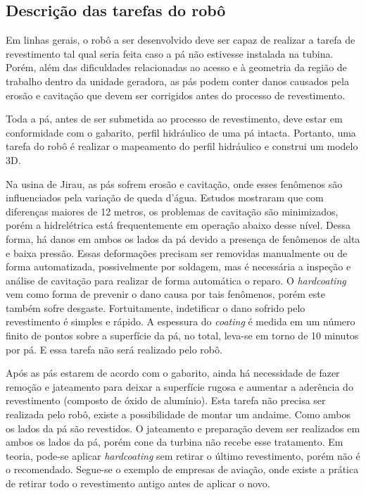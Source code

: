 \subsection{Descrição das tarefas do robô}

Em linhas gerais, o robô a ser desenvolvido deve ser capaz de realizar a tarefa
de revestimento tal qual seria feita caso a pá não estivesse instalada na
tubina. Porém, além das dificuldades relacionadas ao acesso e à geometria da
região de trabalho dentro da unidade geradora, as pás podem conter danos
causados pela erosão e cavitação que devem ser corrigidos antes do processo de
revestimento.

Toda a pá, antes de ser submetida ao processo de revestimento, deve estar
em conformidade com o gabarito, perfil hidráulico de uma pá
intacta. Portanto, uma tarefa do robô é realizar o mapeamento do perfil
hidráulico e construi um modelo 3D.

Na usina de Jirau, as pás sofrem erosão e cavitação, onde esses fenômenos são
influenciados pela variação de queda d'água. Estudos mostraram que com
diferenças maiores de 12 metros, os problemas de cavitação são minimizados,
porém a hidrelétrica está frequentemente em operação abaixo desse nível.
Dessa forma, há danos em ambos os lados da pá devido a presença de fenômenos de
alta e baixa pressão. Essas deformações precisam ser removidas manualmente ou de
forma automatizada, possivelmente por soldagem, mas é necessária a inspeção e
análise de cavitação para realizar de forma automática o reparo. O
\textit{hardcoating} vem como forma de prevenir o dano causa por tais fenômenos,
porém este também sofre desgaste. Fortuitamente, indetificar o dano sofrido pelo
revestimento é simples e rápido. A espessura do \textit{coating} é medida em um
número finito de pontos sobre a superfície da pá, no total, leva-se em torno de
10 minutos por pá. E essa tarefa não será realizado pelo robô.

Após as pás estarem de acordo com o gabarito, ainda há necessidade de fazer
remoção e jateamento para deixar a superfície rugosa e aumentar a aderência do
revestimento (composto de óxido de alumínio). Esta tarefa não precisa ser
realizada pelo robô, existe a possibilidade de montar um andaime. Como ambos os
lados da pá são revestidos. O jateamento e preparação devem ser realizados em
ambos os lados da pá, porém cone da turbina não recebe esse tratamento. Em
teoria, pode-se aplicar \textit{hardcoating} sem retirar o último revestimento,
porém não é o recomendado. Segue-se o exemplo de empresas de aviação, onde
existe a prática de retirar todo o revestimento antigo antes de aplicar o novo.

